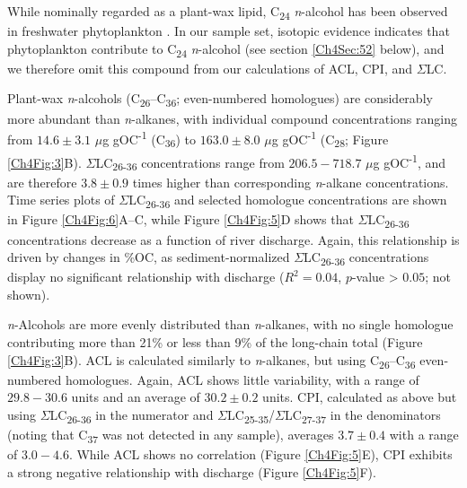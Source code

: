 While nominally regarded as a plant-wax lipid, C\textsubscript{24} \textit{n}-alcohol has been observed in freshwater phytoplankton \citep{Volkman:1998tk,Volkman:1999tq,Xu:2007jk}. In our sample set, isotopic evidence indicates that phytoplankton contribute to C\textsubscript{24} \textit{n}-alcohol (see section \ref{Ch4Sec:52} below), and we therefore omit this compound from our calculations of ACL, CPI, and $\Sigma$LC. 

Plant-wax \textit{n}-alcohols (C\textsubscript{26}--C\textsubscript{36}; even-numbered homologues) are considerably more abundant than \textit{n}-alkanes, with individual compound concentrations ranging from $14.6 \pm 3.1$ $\mu$g gOC\textsuperscript{-1} (C\textsubscript{36}) to $163.0 \pm 8.0$ $\mu$g gOC\textsuperscript{-1} (C\textsubscript{28}; Figure \ref{Ch4Fig:3}B). $\Sigma$LC\textsubscript{26-36} concentrations range from $206.5 - 718.7$ $\mu$g gOC\textsuperscript{-1}, and are therefore $3.8 \pm 0.9$ times higher than corresponding \textit{n}-alkane concentrations. Time series plots of $\Sigma$LC\textsubscript{26-36} and selected homologue concentrations are shown in Figure \ref{Ch4Fig:6}A--C, while Figure \ref{Ch4Fig:5}D shows that $\Sigma$LC\textsubscript{26-36} concentrations decrease as a function of river discharge. Again, this relationship is driven by changes in \%OC, as sediment-normalized $\Sigma$LC\textsubscript{26-36} concentrations display no significant relationship with discharge ($R^2 = 0.04$, $p$-value > $0.05$; not shown).

\textit{n}-Alcohols are more evenly distributed than \textit{n}-alkanes, with no single homologue contributing more than 21\% or less than 9\% of the long-chain total (Figure \ref{Ch4Fig:3}B). ACL is calculated similarly to \textit{n}-alkanes, but using C\textsubscript{26}--C\textsubscript{36} even-numbered homologues. Again, ACL shows little variability, with a range of $29.8 - 30.6$ units and an average of $30.2 \pm 0.2$ units. CPI, calculated as above but using $\Sigma$LC\textsubscript{26-36} in the numerator and $\Sigma$LC\textsubscript{25-35}/$\Sigma$LC\textsubscript{27-37} in the denominators (noting that C\textsubscript{37} was not detected in any sample), averages $3.7 \pm 0.4$ with a range of $3.0 - 4.6$. While ACL shows no correlation (Figure \ref{Ch4Fig:5}E), CPI exhibits a strong negative relationship with discharge (Figure \ref{Ch4Fig:5}F).

